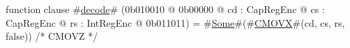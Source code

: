 function clause #\hyperref[zdecode]{decode}# (0b010010 @ 0b00000 @ cd : CapRegEnc @ cs : CapRegEnc @ rs : IntRegEnc @ 0b011011) = #\hyperref[zSome]{Some}#(#\hyperref[zCMOVX]{CMOVX}#(cd, cs, rs, false)) /* CMOVZ */
